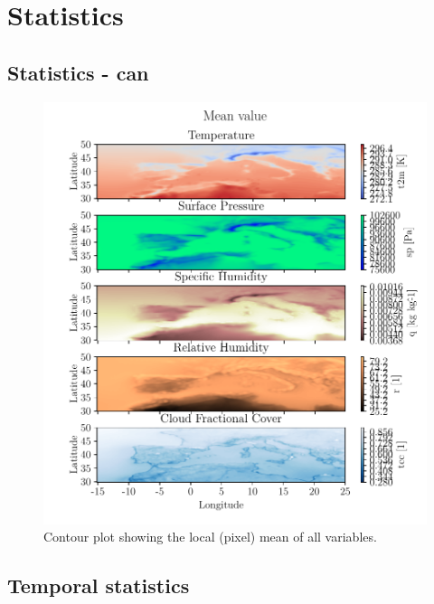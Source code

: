 \appendix
\chapter{Statistics}
\section{Statistics - can }
\begin{figure}[ht]
    \centering
    \includegraphics{python_figs/contourplot_all_variables_mean.pdf}
    \caption{Contour plot showing the local (pixel) mean of all variables.}
    \label{fig:contour_mean_all_vars}
\end{figure}




\section{Temporal statistics}

